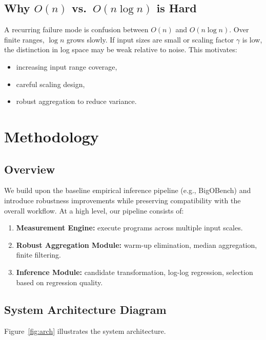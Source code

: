 \documentclass[conference]{IEEEtran}
\newcommand{\toolname}{BigOBench}
\begin{document}
\subsection{Why $O(n)$ vs.\ $O(n \log n)$ is Hard}

A recurring failure mode is confusion between $O(n)$ and $O(n \log n)$.
Over finite ranges, $\log n$ grows slowly.
If input sizes are small or scaling factor $\gamma$ is low, the distinction in
log space may be weak relative to noise.
This motivates:
\begin{itemize}[leftmargin=1.2em]
\item increasing input range coverage,
\item careful scaling design,
\item robust aggregation to reduce variance.
\end{itemize}

\section{Methodology}
\label{sec:method}

\subsection{Overview}

We build upon the baseline empirical inference pipeline (e.g., \toolname)
and introduce robustness improvements while preserving compatibility with the
overall workflow.
At a high level, our pipeline consists of:
\begin{enumerate}[leftmargin=1.2em]
\item \textbf{Measurement Engine:} execute programs across multiple input scales.
\item \textbf{Robust Aggregation Module:} warm-up elimination, median aggregation,
finite filtering.
\item \textbf{Inference Module:} candidate transformation, log-log regression,
selection based on regression quality.
\end{enumerate}

\subsection{System Architecture Diagram}

Figure~\ref{fig:arch} illustrates the system architecture.
\end{document}
